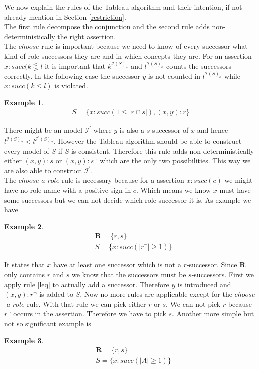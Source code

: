 \documentclass[a4paper,11pt]{scrartcl}
\theoremstyle{break}
\theoremstyle{definition}
\newtheorem{ex}{Example}
\begin{document}
We now explain the rules of the Tableau-algorithm and their intention, if not already mention in Section \ref{restriction}.\\
The first rule decompose the conjunction and the second rule adds non-deterministically the right assertion.\\
The $choose$-rule is important because we need to know of every successor what kind of role successors they are and in which concepts they are. For an assertion $x:succ(k\lesseqgtr l$ it is important that $k^{\mathcal{I}(S)_x}$ and $l^{\mathcal{I}(S)_x}$ counts the successors correctly. In the following case the successor $y$ is not counted in $l^{\mathcal{I}(S)_x}$ while $x:succ(k\leq l)$ is violated.
\begin{ex}
\begin{align*}
S=\{x:succ(1\leq|r\cap s|), (x,y):r\}
\end{align*}
\end{ex}
There might be an model $\mathcal{I^\prime}$ where $y$ is also a $s$-successor of $x$ and hence $l^{\mathcal{I}(S)_x}<l^{\mathcal{I}^\prime(S)_x}$. However the Tableau-algorithm should be able to construct every model of $S$ if $S$ is consistent. Therefore this rule adds non-deterministically either $(x,y):s$ or $(x,y):s^\neg$ which are the only two possibilities. This way we are also able to construct $\mathcal{I^\prime}$.\\
The $choose$-$a$-$role$-rule is necessary because for a assertion $x:succ(c)$ we might have no role name with a positive sign in $c$. Which means we know $x$ must have some successors but we can not decide which role-successor it is. As example we have
\begin{ex}
\begin{align*}
&\mathbf{R}=\{r,s\}\\
&S=\{x:succ(|r^\neg|\geq 1)\}
\end{align*} 
\end{ex}
It states that $x$ have at least one successor which is not a $r$-successor. Since $\mathbf{R}$ only contains $r$ and $s$ we know that the successors must be $s$-successors. First we apply rule \ref{leq} to actually add a successor. Therefore $y$ is introduced and $(x,y):r^\neg$ is added to $S$. Now no more rules are applicable except for the $choose$-$a$-$role$-rule. With that rule we can pick either $r$ or $s$. We can not pick $r$ because $r^\neg$ occurs in the assertion. Therefore we have to pick $s$. Another more simple but not so significant example is
\begin{ex}
\begin{align*}
&\mathbf{R}=\{r,s\}\\
&S=\{x:succ(|A|\geq 1)\}
\end{align*} 
\end{ex}
\end{document}
